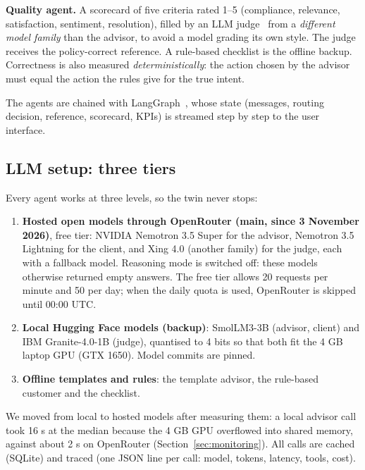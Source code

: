 \textbf{Quality agent.} A scorecard of five criteria rated 1--5 (compliance, relevance, satisfaction,
sentiment, resolution), filled by an LLM judge~\cite{llmjudge} from a \emph{different model family} than the
advisor, to avoid a model grading its own style. The judge receives the policy-correct reference. A
rule-based checklist is the offline backup. Correctness is also measured \emph{deterministically}: the action
chosen by the advisor must equal the action the rules give for the true intent.

The agents are chained with LangGraph~\cite{langgraph}, whose state (messages, routing decision, reference,
scorecard, KPIs) is streamed step by step to the user interface.

\subsection{LLM setup: three tiers}
\label{sec:llmsetup}
Every agent works at three levels, so the twin never stops:
\begin{enumerate}
  \item \textbf{Hosted open models through OpenRouter (main, since 3 November 2026)}, free tier: NVIDIA
        Nemotron 3.5 Super for the advisor, Nemotron 3.5 Lightning for the client, and Xing 4.0 (another
        family) for the judge, each with a fallback model. Reasoning mode is switched off: these models
        otherwise returned empty answers. The free tier allows 20 requests per minute and 50 per day; when the
        daily quota is used, OpenRouter is skipped until 00:00 UTC.
  \item \textbf{Local Hugging Face models (backup)}: SmolLM3-3B (advisor, client) and IBM Granite-4.0-1B
        (judge), quantised to 4 bits so that both fit the 4 GB laptop GPU (GTX 1650). Model commits are pinned.
  \item \textbf{Offline templates and rules}: the template advisor, the rule-based customer and the checklist.
\end{enumerate}
We moved from local to hosted models after measuring them: a local advisor call took 16 s at the median
because the 4 GB GPU overflowed into shared memory, against about 2 s on OpenRouter (Section~\ref{sec:monitoring}).
All calls are cached (SQLite) and traced (one JSON line per call: model, tokens, latency, tools, cost).
